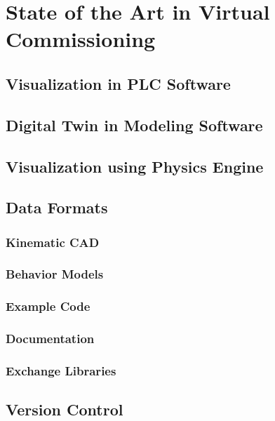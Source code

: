 \chapter{State of the Art in Virtual Commissioning}
\section{Visualization in PLC Software}			%
\section{Digital Twin in Modeling Software}		%
\section{Visualization using Physics Engine}	%
\section{Data Formats}
\subsection{Kinematic CAD}		%
\subsection{Behavior Models}	%
\subsection{Example Code}		%
\subsection{Documentation}		%
\subsection{Exchange Libraries}
\section{Version Control}








